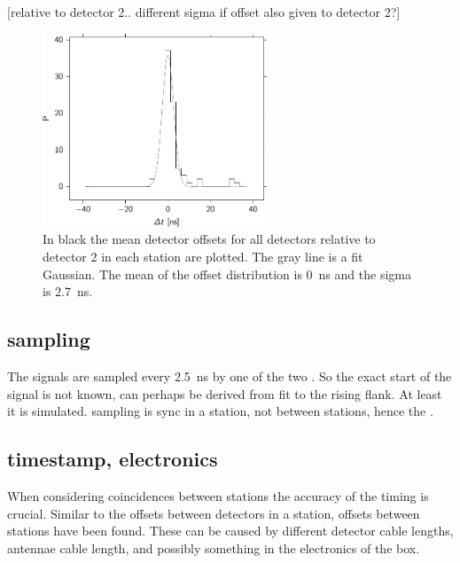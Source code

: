 [relative to detector 2.. different sigma if offset also given to detector 2?]

\begin{figure}
    \centering
    \includegraphics[width=0.6\textwidth]{plots/response/detector_offset_distribution_20140101_d2.pdf}
    \caption{ In black the mean
             detector offsets for all detectors relative to detector 2
             in each station are plotted. The gray line is a fit
             Gaussian. The mean of the offset distribution is
             \SI{0}{\nano\second} and the sigma is
             \SI{2.7}{\nano\second}.}
    \label{fig:detector_offset_distribution}
\end{figure}


\subsection{\adc sampling}

The \pmt signals are sampled every \SI{2.5}{\nano\second} by one of the
two \adcs. So the exact start of the signal is not known, can perhaps be
derived from fit to the rising flank. At least it is simulated. sampling
is sync in a station, not between stations, hence the \gps.


\subsection{\gps timestamp, electronics}

When considering coincidences between stations the accuracy of the
timing is crucial. Similar to the offsets between detectors in a
station, offsets between stations have been found. These can be caused
by different detector cable lengths, \gps antennae cable length, and
possibly something in the electronics of the \hisparc box.

